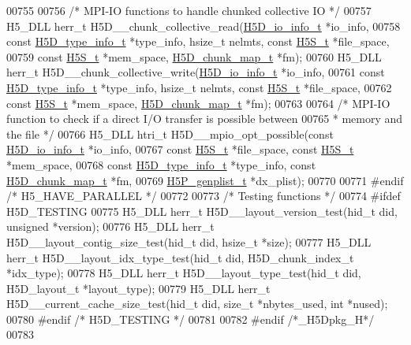 \begin{DoxyCode}
00755 
00756 \textcolor{comment}{/* MPI-IO functions to handle chunked collective IO */}
00757 H5\_DLL herr\_t H5D\_\_chunk\_collective\_read(\hyperlink{struct_h5_d__io__info__t}{H5D\_io\_info\_t} *io\_info,
00758     \textcolor{keyword}{const} \hyperlink{struct_h5_d__type__info__t}{H5D\_type\_info\_t} *type\_info, hsize\_t nelmts, \textcolor{keyword}{const} \hyperlink{struct_h5_s__t}{H5S\_t} *file\_space,
00759     \textcolor{keyword}{const} \hyperlink{struct_h5_s__t}{H5S\_t} *mem\_space, \hyperlink{struct_h5_d__chunk__map__t}{H5D\_chunk\_map\_t} *fm);
00760 H5\_DLL herr\_t H5D\_\_chunk\_collective\_write(\hyperlink{struct_h5_d__io__info__t}{H5D\_io\_info\_t} *io\_info,
00761     \textcolor{keyword}{const} \hyperlink{struct_h5_d__type__info__t}{H5D\_type\_info\_t} *type\_info, hsize\_t nelmts, \textcolor{keyword}{const} \hyperlink{struct_h5_s__t}{H5S\_t} *file\_space,
00762     \textcolor{keyword}{const} \hyperlink{struct_h5_s__t}{H5S\_t} *mem\_space, \hyperlink{struct_h5_d__chunk__map__t}{H5D\_chunk\_map\_t} *fm);
00763 
00764 \textcolor{comment}{/* MPI-IO function to check if a direct I/O transfer is possible between}
00765 \textcolor{comment}{ * memory and the file */}
00766 H5\_DLL htri\_t H5D\_\_mpio\_opt\_possible(\textcolor{keyword}{const} \hyperlink{struct_h5_d__io__info__t}{H5D\_io\_info\_t} *io\_info,
00767     \textcolor{keyword}{const} \hyperlink{struct_h5_s__t}{H5S\_t} *file\_space, \textcolor{keyword}{const} \hyperlink{struct_h5_s__t}{H5S\_t} *mem\_space,
00768     \textcolor{keyword}{const} \hyperlink{struct_h5_d__type__info__t}{H5D\_type\_info\_t} *type\_info, \textcolor{keyword}{const} \hyperlink{struct_h5_d__chunk__map__t}{H5D\_chunk\_map\_t} *fm,
00769     \hyperlink{struct_h5_p__genplist__t}{H5P\_genplist\_t} *dx\_plist);
00770 
00771 \textcolor{preprocessor}{#endif }\textcolor{comment}{/* H5\_HAVE\_PARALLEL */}\textcolor{preprocessor}{}
00772 
00773 \textcolor{comment}{/* Testing functions */}
00774 \textcolor{preprocessor}{#ifdef H5D\_TESTING}
00775 H5\_DLL herr\_t H5D\_\_layout\_version\_test(hid\_t did, \textcolor{keywordtype}{unsigned} *version);
00776 H5\_DLL herr\_t H5D\_\_layout\_contig\_size\_test(hid\_t did, hsize\_t *size);
00777 H5\_DLL herr\_t H5D\_\_layout\_idx\_type\_test(hid\_t did, H5D\_chunk\_index\_t *idx\_type);
00778 H5\_DLL herr\_t H5D\_\_layout\_type\_test(hid\_t did, H5D\_layout\_t *layout\_type);
00779 H5\_DLL herr\_t H5D\_\_current\_cache\_size\_test(hid\_t did, \textcolor{keywordtype}{size\_t} *nbytes\_used, \textcolor{keywordtype}{int} *nused);
00780 \textcolor{preprocessor}{#endif }\textcolor{comment}{/* H5D\_TESTING */}\textcolor{preprocessor}{}
00781 
00782 \textcolor{preprocessor}{#endif }\textcolor{comment}{/*\_H5Dpkg\_H*/}\textcolor{preprocessor}{}
00783 
\end{DoxyCode}

